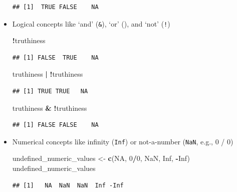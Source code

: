 \documentclass[]{article}
\newenvironment{Shaded}{\begin{snugshade}}{\end{snugshade}}
\newcommand{\KeywordTok}[1]{\textcolor[rgb]{0.13,0.29,0.53}{\textbf{#1}}}
\newcommand{\DecValTok}[1]{\textcolor[rgb]{0.00,0.00,0.81}{#1}}
\newcommand{\StringTok}[1]{\textcolor[rgb]{0.31,0.60,0.02}{#1}}
\newcommand{\OtherTok}[1]{\textcolor[rgb]{0.56,0.35,0.01}{#1}}
\newcommand{\OperatorTok}[1]{\textcolor[rgb]{0.81,0.36,0.00}{\textbf{#1}}}
\newcommand{\NormalTok}[1]{#1}
\theoremstyle{definition}
\theoremstyle{definition}
\theoremstyle{remark}
\begin{document}
\begin{itemize}
\begin{verbatim}
## [1]  TRUE FALSE    NA
\end{verbatim}
\item
  Logical concepts like `and' (\texttt{\&}), `or' (\texttt{\textbar{}}),
  and `not' (\texttt{!})

\begin{Shaded}
\begin{Highlighting}[]
\OperatorTok{!}\NormalTok{truthiness}
\end{Highlighting}
\end{Shaded}

\begin{verbatim}
## [1] FALSE  TRUE    NA
\end{verbatim}

\begin{Shaded}
\begin{Highlighting}[]
\NormalTok{truthiness }\OperatorTok{|}\StringTok{ }\OperatorTok{!}\NormalTok{truthiness}
\end{Highlighting}
\end{Shaded}

\begin{verbatim}
## [1] TRUE TRUE   NA
\end{verbatim}

\begin{Shaded}
\begin{Highlighting}[]
\NormalTok{truthiness }\OperatorTok{&}\StringTok{ }\OperatorTok{!}\NormalTok{truthiness}
\end{Highlighting}
\end{Shaded}

\begin{verbatim}
## [1] FALSE FALSE    NA
\end{verbatim}
\item
  Numerical concepts like infinity (\texttt{Inf}) or not-a-number
  (\texttt{NaN}, e.g., 0 / 0)

\begin{Shaded}
\begin{Highlighting}[]
\NormalTok{undefined_numeric_values <-}\StringTok{ }\KeywordTok{c}\NormalTok{(}\OtherTok{NA}\NormalTok{, }\DecValTok{0}\OperatorTok{/}\DecValTok{0}\NormalTok{, }\OtherTok{NaN}\NormalTok{, }\OtherTok{Inf}\NormalTok{, }\OperatorTok{-}\OtherTok{Inf}\NormalTok{)}
\NormalTok{undefined_numeric_values}
\end{Highlighting}
\end{Shaded}

\begin{verbatim}
## [1]   NA  NaN  NaN  Inf -Inf
\end{verbatim}


\end{itemize}
\end{document}
